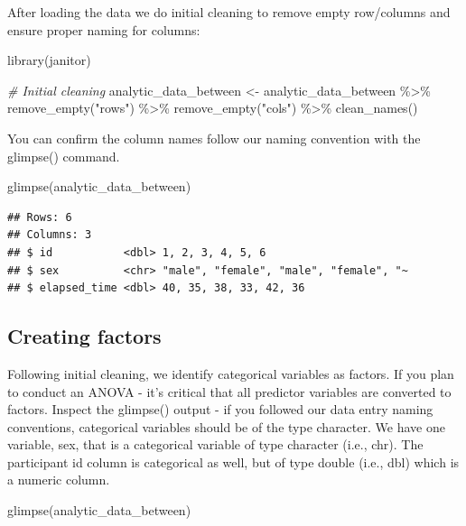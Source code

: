 \documentclass[
]{krantz}
\makeatletter
\newenvironment{Shaded}{\begin{snugshade}}{\end{snugshade}}
\newcommand{\CommentTok}[1]{\textcolor[rgb]{0.37,0.37,0.37}{\textit{#1}}}
\newcommand{\FunctionTok}[1]{\textcolor[rgb]{0,0,0}{#1}}
\newcommand{\NormalTok}[1]{#1}
\newcommand{\OtherTok}[1]{\textcolor[rgb]{0.37,0.37,0.37}{#1}}
\newcommand{\SpecialCharTok}[1]{\textcolor[rgb]{0,0,0}{#1}}
\newcommand{\StringTok}[1]{\textcolor[rgb]{0.5,0.5,0.5}{#1}}
\newenvironment{kframe}{%
\medskip{}
\setlength{\fboxsep}{.8em}
 \def\at@end@of@kframe{}%
 \ifinner\ifhmode%
  \def\at@end@of@kframe{\end{minipage}}%
  \begin{minipage}{\columnwidth}%
 \fi\fi%
 \def\FrameCommand##1{\hskip\@totalleftmargin \hskip-\fboxsep
 \colorbox{shadecolor}{##1}\hskip-\fboxsep
     \hskip-\linewidth \hskip-\@totalleftmargin \hskip\columnwidth}%
 \MakeFramed {\advance\hsize-\width
   \@totalleftmargin\z@ \linewidth\hsize
   \@setminipage}}%
 {\par\unskip\endMakeFramed%
 \at@end@of@kframe}
\renewenvironment{Shaded}{\begin{kframe}}{\end{kframe}}
\makeatother
\begin{document}
After loading the data we do initial cleaning to remove empty row/columns and ensure proper naming for columns:

\begin{Shaded}
\begin{Highlighting}[]
\FunctionTok{library}\NormalTok{(janitor)}

\CommentTok{\# Initial cleaning}
\NormalTok{analytic\_data\_between }\OtherTok{\textless{}{-}}\NormalTok{ analytic\_data\_between }\SpecialCharTok{\%\textgreater{}\%}
  \FunctionTok{remove\_empty}\NormalTok{(}\StringTok{"rows"}\NormalTok{) }\SpecialCharTok{\%\textgreater{}\%}
  \FunctionTok{remove\_empty}\NormalTok{(}\StringTok{"cols"}\NormalTok{) }\SpecialCharTok{\%\textgreater{}\%}
  \FunctionTok{clean\_names}\NormalTok{()}
\end{Highlighting}
\end{Shaded}

You can confirm the column names follow our naming convention with the glimpse() command.

\begin{Shaded}
\begin{Highlighting}[]
\FunctionTok{glimpse}\NormalTok{(analytic\_data\_between)}
\end{Highlighting}
\end{Shaded}

\begin{verbatim}
## Rows: 6
## Columns: 3
## $ id           <dbl> 1, 2, 3, 4, 5, 6
## $ sex          <chr> "male", "female", "male", "female", "~
## $ elapsed_time <dbl> 40, 35, 38, 33, 42, 36
\end{verbatim}

\hypertarget{creating-factors-2}{%
\subsection{Creating factors}\label{creating-factors-2}}

Following initial cleaning, we identify categorical variables as factors. If you plan to conduct an ANOVA - it's critical that all predictor variables are converted to factors. Inspect the glimpse() output - if you followed our data entry naming conventions, categorical variables should be of the type character. We have one variable, sex, that is a categorical variable of type character (i.e., chr). The participant id column is categorical as well, but of type double (i.e., dbl) which is a numeric column.

\begin{Shaded}
\begin{Highlighting}[]
\FunctionTok{glimpse}\NormalTok{(analytic\_data\_between)}
\end{Highlighting}
\end{Shaded}
\end{document}
